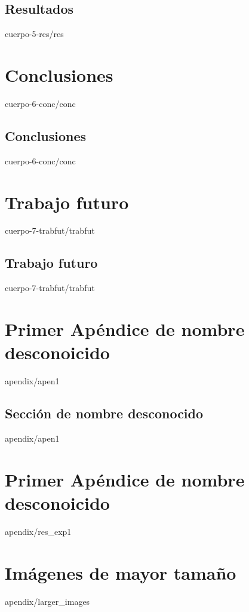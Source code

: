 \documentclass[epsbased,copyright,final,printable,covers,extendedindex,firstnumbered,tfg,gnuplot]{tfgtfmthesisuam}
\begin{document}
  \section{Resultados\label{SEC:RES_S1}}{cuerpo-5-res/res}

\chapter{Conclusiones\label{CAP:CONC}}{cuerpo-6-conc/conc}
  \section{Conclusiones\label{SEC:CONC_S1}}{cuerpo-6-conc/conc}

\chapter{Trabajo futuro\label{CAP:TRABFUT}}{cuerpo-7-trabfut/trabfut}
  \section{Trabajo futuro\label{SEC:TRABFUT_S1}}{cuerpo-7-trabfut/trabfut}

\appendix
\chapter{Primer Apéndice de nombre desconoicido\label{CAP:APEN1}}{apendix/apen1}
  \section{Sección de nombre desconocido\label{SEC:APEN1_S1}}{apendix/apen1}
\chapter{Primer Apéndice de nombre desconoicido\label{CAP:RES_EXP1}}{apendix/res_exp1}
\chapter{Imágenes de mayor tamaño\label{CAP:IMAGENES}}{apendix/larger_images}


\end{document}

